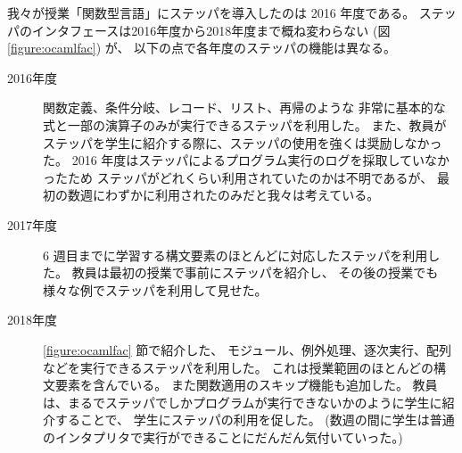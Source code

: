 我々が授業「関数型言語」にステッパを導入したのは 2016 年度である。
ステッパのインタフェースは2016年度から2018年度まで概ね変わらない (図 \ref{figure:ocamlfac}) が、
以下の点で各年度のステッパの機能は異なる。
\begin{description}
\item[2016年度] 関数定義、条件分岐、レコード、リスト、再帰のような
非常に基本的な式と一部の演算子のみが実行できるステッパを利用した。
また、教員がステッパを学生に紹介する際に、ステッパの使用を強くは奨励しなかった。
2016 年度はステッパによるプログラム実行のログを採取していなかったため
ステッパがどれくらい利用されていたのかは不明であるが、
最初の数週にわずかに利用されたのみだと我々は考えている。
\item[2017年度] 6 週目までに学習する構文要素のほとんどに対応したステッパを利用した。
教員は最初の授業で事前にステッパを紹介し、
その後の授業でも様々な例でステッパを利用して見せた。
\item[2018年度] \ref{figure:ocamlfac} 節で紹介した、
モジュール、例外処理、逐次実行、配列などを実行できるステッパを利用した。
これは授業範囲のほとんどの構文要素を含んでいる。
また関数適用のスキップ機能も追加した。
教員は、まるでステッパでしかプログラムが実行できないかのように学生に紹介することで、
学生にステッパの利用を促した。
(数週の間に学生は普通のインタプリタで実行ができることにだんだん気付いていった。)
\end{description}

